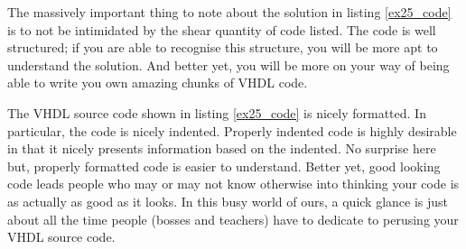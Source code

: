 \begin{my_list}
\item The massively important thing to note about the solution in listing \ref{ex25_code} is to not be intimidated by the shear quantity of code listed. The code is well structured; if you are able to recognise this structure, you will be more apt to understand the solution. And better yet, you will be more on your way of being able to write you own amazing chunks of VHDL code. 

\item The VHDL source code shown in listing \ref{ex25_code} is nicely formatted. In particular, the code is nicely indented. Properly indented code is highly desirable in that it nicely presents information based on the indented. No surprise here but, properly formatted code is easier to understand. Better yet, good looking code leads people who may or may not know otherwise into thinking your code is as actually as good as it looks. In this busy world of ours, a quick glance is just about all the time people (bosses and teachers) have to dedicate to perusing your VHDL source code.
\end{my_list}


